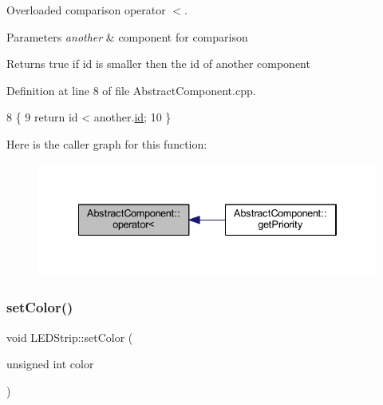 Overloaded comparison operator \textquotesingle{}$<$\textquotesingle{}. 


\begin{DoxyParams}{Parameters}
{\em another} & component for comparison \\
\hline
\end{DoxyParams}
\begin{DoxyReturn}{Returns}
true if id is smaller then the id of another component 
\end{DoxyReturn}


Definition at line 8 of file Abstract\+Component.\+cpp.


\begin{DoxyCode}
8                                                                         \{
9     \textcolor{keywordflow}{return} \textcolor{keywordtype}{id} < another.\hyperlink{class_abstract_component_a9c9c548149681b1a1dd935e66ed5dd11}{id};
10 \}
\end{DoxyCode}
Here is the caller graph for this function\+:
\nopagebreak
\begin{figure}[H]
\begin{center}
\leavevmode
\includegraphics[width=334pt]{class_abstract_component_a0c2e458144111c5f599c66f168516abc_icgraph}
\end{center}
\end{figure}
\mbox{\label{class_l_e_d_strip_a310b381acdd83a01ddb6e2debebbbc7c}} 
\subsubsection{\texorpdfstring{set\+Color()}{setColor()}\hspace{0.1cm}{\footnotesize\ttfamily [1/2]}}
{\footnotesize\ttfamily void L\+E\+D\+Strip\+::set\+Color (\begin{DoxyParamCaption}\item[{unsigned int}]{color }\end{DoxyParamCaption})}



